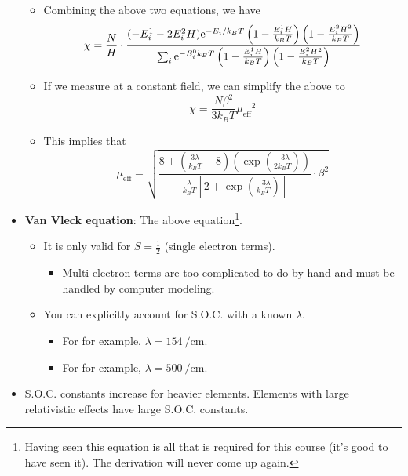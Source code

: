 \documentclass[../notes.tex]{subfiles}
\begin{document}
\begin{itemize}
\begin{itemize}
        \item Combining the above two equations, we have
        \begin{equation*}
            \chi = \frac{N}{H}\cdot\frac{(-E_i^1-2E_i^2H)\e[-E_i/k_BT]\left( 1-\frac{E_i^1H}{k_BT} \right)\left( 1-\frac{E_i^2H^2}{k_BT} \right)}{\sum_i\e[-E_i^0k_BT]\left( 1-\frac{E_i^1H}{k_BT} \right)\left( 1-\frac{E_i^2H^2}{k_BT} \right)}
        \end{equation*}
        \item If we measure at a constant field, we can simplify the above to
        \begin{equation*}
            \chi = \frac{N\beta^2}{3k_BT}{\mu_\text{eff}}^2
        \end{equation*}
        \item This implies that
        \begin{equation*}
            \mu_\text{eff} = \sqrt{\frac{8+\left( \frac{3\lambda}{k_BT}-8 \right)\left( \exp(\frac{-3\lambda}{2k_BT}) \right)}{\frac{\lambda}{k_BT}\left[ 2+\exp(\frac{-3\lambda}{k_BT}) \right]}\cdot\beta^2}
        \end{equation*}
    \end{itemize}
    \item \textbf{Van Vleck equation}: The above equation\footnote{Having seen this equation is all that is required for this course (it's good to have seen it). The derivation will never come up again.}.
    \begin{itemize}
        \item It is only valid for $S=\frac{1}{2}$ (single electron terms).
        \begin{itemize}
            \item Multi-electron terms are too complicated to do by hand and must be handled by computer modeling.
        \end{itemize}
        \item You can explicitly account for S.O.C. with a known $\lambda$.
        \begin{itemize}
            \item For  for example, $\lambda=\SI{154}{\per\centi\meter}$.
            \item For  for example, $\lambda=\SI{500}{\per\centi\meter}$.
        \end{itemize}
    \end{itemize}
    \item S.O.C. constants increase for heavier elements. Elements with large relativistic effects have large S.O.C. constants.

\end{itemize}
\end{document}
